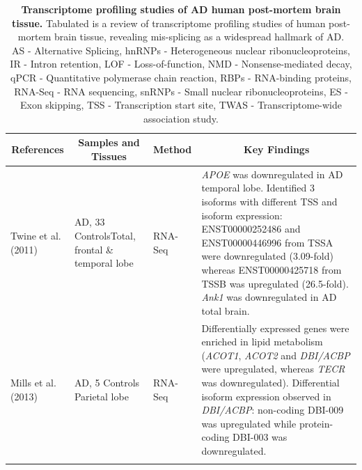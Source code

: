 \begin{landscape}
	\small %
	\setlength\tabcolsep{2pt} %
	\renewcommand{\arraystretch}{1}
	\begin{longtable}[c]{p{3cm}p{4cm}p{3cm}p{16cm}}
		\caption[Transcriptome profiling studies of AD human post-mortem brain tissue]%
		{\textbf{Transcriptome profiling studies of AD human post-mortem brain tissue.} Tabulated is a review of transcriptome profiling studies of human post-mortem brain tissue, revealing mis-splicing as a widespread hallmark of AD. \newline AS - Alternative Splicing, hnRNPs - Heterogeneous nuclear ribonucleoproteins, IR - Intron retention, LOF - Loss-of-function, NMD - Nonsense-mediated decay, qPCR - Quantitative polymerase chain reaction, RBPs - RNA-binding proteins, RNA-Seq - RNA sequencing, snRNPs - Small nuclear ribonucleoproteins, ES - Exon skipping, TSS - Transcription start site, TWAS - Transcriptome-wide association study.}
		\label{tab: AS_ADHuman_studies}\\
		
		\toprule
		\multicolumn{1}{c}{References} &
		\multicolumn{1}{c}{Samples and Tissues} &
		\multicolumn{1}{c}{Method} &
		\multicolumn{1}{c}{Key Findings} \\* \midrule
		\endfirsthead
		\endhead
		\bottomrule
		\endfoot
		\endlastfoot
		\centering Twine et al. (2011)\cite{Twine2011} &
		\centering 3 AD, 33 Controls\newline Total, frontal \& temporal lobe &
		\centering RNA-Seq &
		\tabitem \textit{APOE} was downregulated in AD temporal lobe. Identified 3 isoforms with different TSS and isoform expression: ENST00000252486 and ENST00000446996 from TSSA were downregulated (3.09-fold) whereas ENST00000425718 from TSSB was upregulated (26.5-fold). \newline
		\tabitem \textit{Ank1} was downregulated in AD total brain. \\
		\hdashline[0.5pt/5pt]
		
		\centering Mills et al. (2013)\cite{Mills2013} &
		\centering 5 AD, 5 Controls \newline Parietal lobe &
		\centering RNA-Seq &
		\tabitem Differentially expressed genes were enriched in lipid metabolism (\textit{ACOT1}, \textit{ACOT2} and \textit{DBI/ACBP} were upregulated, whereas \textit{TECR} was downregulated). \newline
		\tabitem Differential isoform expression observed in \textit{DBI/ACBP}: non-coding DBI-009 was upregulated while protein-coding DBI-003 was downregulated. \\
		\hdashline[0.5pt/5pt]
		

\end{longtable}
\end{landscape}
